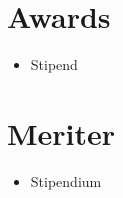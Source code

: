 \ifinenglish
	\section{Awards}
	\begin{itemize}
	\setlength\itemsep{0pt}
	\item Stipend
	\end{itemize}
\else
	\section{Meriter}
	\begin{itemize}
	\setlength\itemsep{0pt}
	\item Stipendium
	\end{itemize}
\fi
